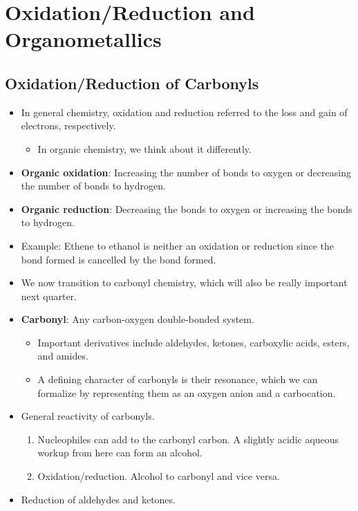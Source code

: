 \documentclass[../notes.tex]{subfiles}
\begin{document}
\chapter{Oxidation/Reduction and Organometallics}
\section{Oxidation/Reduction of Carbonyls}
\begin{itemize}
    \item {}In general chemistry, oxidation and reduction referred to the loss and gain of electrons, respectively.
    \begin{itemize}
        \item In organic chemistry, we think about it differently.
    \end{itemize}
    \item \textbf{Organic oxidation}: Increasing the number of bonds to oxygen or decreasing the number of bonds to hydrogen.
    \item \textbf{Organic reduction}: Decreasing the bonds to oxygen or increasing the bonds to hydrogen.
    \item Example: Ethene to ethanol is neither an oxidation or reduction since the  bond formed is cancelled by the  bond formed.
    \item We now transition to carbonyl chemistry, which will also be really important next quarter.
    \item \textbf{Carbonyl}: Any carbon-oxygen double-bonded system.
    \begin{itemize}
        \item Important derivatives include aldehydes, ketones, carboxylic acids, esters, and amides.
        \item A defining character of carbonyls is their resonance, which we can formalize by representing them as an oxygen anion and a carbocation.
    \end{itemize}
    \item General reactivity of carbonyls.
    \begin{enumerate}
        \item Nucleophiles can add to the carbonyl carbon. A slightly acidic aqueous workup from here can form an alcohol.
        \item Oxidation/reduction. Alcohol to carbonyl and vice versa.
    \end{enumerate}
    \item Reduction of aldehydes and ketones.

\end{itemize}
\end{document}
